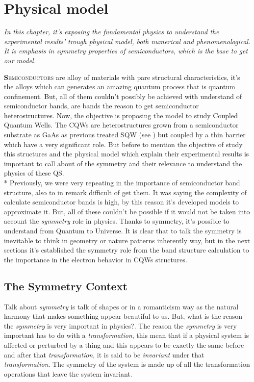 \chapter{Physical model}
\label{chap:Chapter-2}
\textit{In this chapter, it's exposing the fundamental physics to understand the experimental results' trough physical model, both numerical and phenomenological. It is emphasis in symmetry properties of semiconductors, which is the base to get our model.}
\vfill
\minitoc
\newpage

\lettrine[lines=3, lraise=.1, nindent=0mm, slope=0mm]{\textbf{S}}{emiconductors} are alloy of materials with pare structural characteristics, it's the alloys which can generates an amazing quantum process that is quantum confinement.  But, all of them  couldn't possibly be achieved with understand of semiconductor bands, are bands the reason to get semiconductor heterostructures. Now, the objective is proposing the model to study Coupled Quantum Wells. The CQWs are heterostructures grown from a semiconductor substrate as GaAs as previous treated SQW (see ) but coupled by a thin barrier which have a very significant role. But before to mention the objective of study this structures and the physical model which explain their experimental results  is important to call about of the symmetry and their relevance to understand the physics of these QS. \\*
Previously,  we were very repeating in the importance of semiconductor band structure, also to  in remark difficult of get them. It was saying the complexity of calculate semiconductor bands is high, by this reason it's developed models to approximate it. But, all of these couldn't be possible if it would not be taken into account the \emph{symmetry} role in physics\cite{van1989laws}. Thanks to symmetry, it's possible to understand from Quantum to Universe. It is clear that to talk the symmetry is inevitable to think in geometry or nature patterns  inherently way, but in the next sections it's established the symmetry role from the band structure calculation to  the importance in the electron behavior in CQWs structures. 

\section{The Symmetry Context}
\label{sec:chapter-2-from-symmetry}
\vspace{-10mm}
Talk about \emph{symmetry} is talk of shapes or in a romanticism way as  the natural harmony that makes something appear beautiful to us\cite{powell2010symmetry,tapp2021symmetry}. But, what is the reason the \emph{symmetry} is very important in physics?. The reason the  \emph{symmetry} is very important has to do with a \emph{transformation}, this mean that if a physical system is affected or perturbed by a thing and this appears to be exactly the same before and after that \emph{transformation}, it is said to be
\emph{invariant} under that \emph{transformation}. The symmetry of the system is made up of all the transformation operations that leave the system invariant\cite{powell2010symmetry}.


